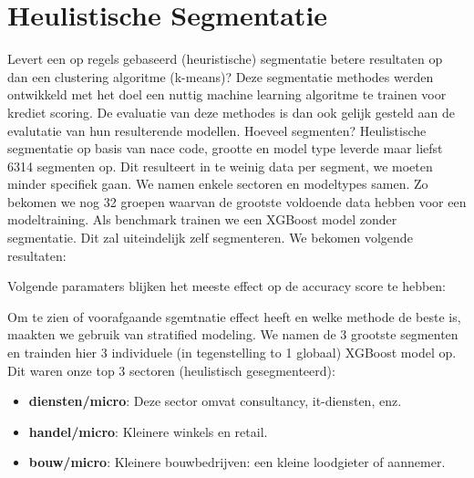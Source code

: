 \section{Heulistische Segmentatie}
Levert een op regels gebaseerd (heuristische) segmentatie betere resultaten op dan een clustering algoritme (k-means)?
Deze segmentatie methodes werden ontwikkeld met het doel een nuttig machine learning algoritme te trainen voor krediet scoring.
De evaluatie van deze methodes is dan ook gelijk gesteld aan de evalutatie van hun resulterende modellen.
Hoeveel segmenten? Heulistische segmentatie op basis van nace code, grootte en model type leverde maar liefst 6314 segmenten op. Dit resulteert in te weinig data per segment, we moeten minder specifiek gaan.
We namen enkele sectoren en modeltypes samen. Zo bekomen we nog 32 groepen waarvan de grootste voldoende data hebben voor een modeltraining.
\linebreak
Als benchmark trainen we een XGBoost model zonder segmentatie. Dit zal uiteindelijk zelf segmenteren. We bekomen volgende resultaten:
\begin{table}[htbp]
    \small
    \caption{XGBoost model metrics zonder voorafgaande segmentatie}
    \label{tab:model_metrics_no_seg}
    
\end{table}

Volgende paramaters blijken het meeste effect op de accuracy score te hebben:

\begin{table}[htbp]
    \small
    \caption{Feature importance XGBoost model zonder voorafgaande segmentatie}
    \label{tab:feature_importance_no_seg}
    
\end{table}

Om te zien of voorafgaande sgemtnatie effect heeft en welke methode de beste is, maakten we gebruik van stratified modeling. We namen de 3 grootste segmenten en trainden hier 3 individuele (in tegenstelling to 1 globaal) XGBoost model op.
Dit waren onze top 3 sectoren (heulistisch gesegmenteerd):
\begin{itemize}
    \item \textbf{diensten/micro}: Deze sector omvat consultancy, it-diensten, enz.
    \item \textbf{handel/micro}: Kleinere winkels en retail.
    \item \textbf{bouw/micro}: Kleinere bouwbedrijven: een kleine loodgieter of aannemer.
  \end{itemize}

